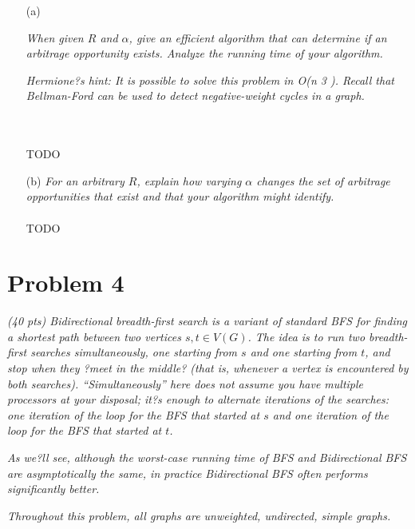 \documentclass[12pt]{article} \setlength{\oddsidemargin}{0in}
\begin{document}
\begin{enumerate}
\item[(a)]{\textit{When given $R$ and $\alpha$, give an efficient algorithm that can determine if an arbitrage opportunity exists. Analyze the running time of your algorithm.}

    \textit{Hermione?s hint: It is possible to solve this problem in O(n 3 ). Recall that Bellman-Ford can be used to detect negative-weight cycles in a graph.}
  }
  \\\\
  TODO
  \\
\item[(b)]{\textit{For an arbitrary $R$, explain how varying $\alpha$ changes the set of arbitrage opportunities that exist and that your algorithm might identify.}}
  \\\\
  TODO

\end{enumerate}

\newpage
\section*{Problem 4}

\textit{(40 pts) Bidirectional breadth-first search is a variant of standard BFS for finding a
shortest path between two vertices $s, t \in V(G)$. The idea is to run two breadth-first
searches simultaneously, one starting from $s$ and one starting from $t$, and stop when
they ?meet in the middle? (that is, whenever a vertex is encountered by both searches).
``Simultaneously'' here does not assume you have multiple processors at your disposal;
it?s enough to alternate iterations of the searches: one iteration of the loop for the BFS
that started at $s$ and one iteration of the loop for the BFS that started at $t$.}

\textit{As we?ll see, although the worst-case running time of BFS and Bidirectional BFS are
asymptotically the same, in practice Bidirectional BFS often performs significantly
better.}

\textit{Throughout this problem, all graphs are unweighted, undirected, simple graphs.}
\\\\
\end{document}
